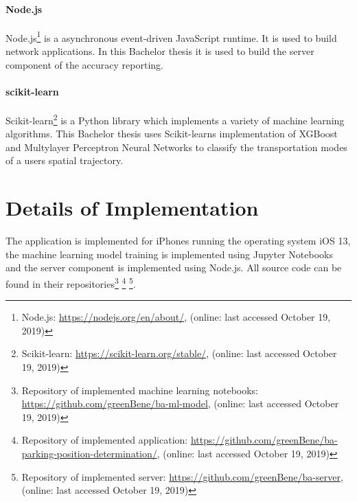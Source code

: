 \paragraph{Node.js} Node.js\footnote{Node.js: \url{https://nodejs.org/en/about/}, (online: last accessed October 19, 2019)} is a asynchronous event-driven JavaScript runtime. It is used to build network applications. In this Bachelor thesis it is used to build the server component of the accuracy reporting. \cite{node}

\paragraph{scikit-learn} Scikit-learn\footnote{Scikit-learn: \url{https://scikit-learn.org/stable/}, (online: last accessed October 19, 2019)} is a Python library which implements a variety of machine learning algorithms. This Bachelor thesis uses Scikit-learns implementation of XGBoost and Multylayer Perceptron Neural Networks to classify the transportation modes of a users spatial trajectory. \cite{scikit-learn}

\section{Details of Implementation}

The application is implemented for iPhones running the operating system iOS 13, the machine learning model training is implemented using Jupyter Notebooks and the server component is implemented using Node.js. All source code can be found in their repositories\footnote{Repository of implemented machine learning notebooks: \url{https://github.com/greenBene/ba-ml-model}, (online: last accessed October 19, 2019)} \footnote{Repository of implemented application: \url{https://github.com/greenBene/ba-parking-position-determination/}, (online: last accessed October 19, 2019)} \footnote{Repository of implemented server: \url{https://github.com/greenBene/ba-server}, (online: last accessed October 19, 2019)}.

